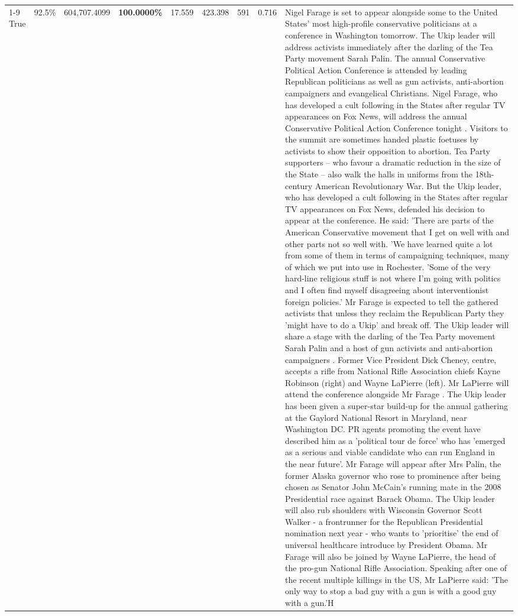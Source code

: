 \begin{table}[H]
\begin{tabular}{lllrlllll}
\cline{1-9}
True & 92.5\% & 604,707.4099 & \bfseries \color{red} 100.0000\% & 17.559 & 423.398 & 591 & 0.716 & Nigel Farage is set to appear alongside some to the United States' most high-profile conservative politicians at a conference in Washington tomorrow. The Ukip leader will address activists immediately after the darling of the Tea Party movement Sarah Palin. The annual Conservative Political Action Conference is attended by leading Republican politicians as well as gun activists, anti-abortion campaigners and evangelical Christians. Nigel Farage, who has developed a cult following in the States after regular TV appearances on Fox News, will address the annual Conservative Political Action Conference tonight . Visitors to the summit are sometimes handed plastic foetuses by activists to show their opposition to abortion. Tea Party supporters – who favour a dramatic reduction in the size of the State – also walk the halls in uniforms from the 18th-century American Revolutionary War. But the Ukip leader, who has developed a cult following in the States after regular TV appearances on Fox News, defended his decision to appear at the conference. He said: 'There are parts of the American Conservative movement that I get on well with and other parts not so well with. 'We have learned quite a lot from some of them in terms of campaigning techniques, many of which we put into use in Rochester. 'Some of the very hard-line religious stuff is not where I'm going with politics and I often find myself disagreeing about interventionist foreign policies.' Mr Farage is expected to tell the gathered activists that unless they reclaim the Republican Party they 'might have to do a Ukip' and break off. The Ukip leader will share a stage with the darling of the Tea Party movement Sarah Palin and a host of gun activists and anti-abortion campaigners . Former Vice President Dick Cheney, centre, accepts a rifle from National Rifle Association chiefs Kayne Robinson (right) and Wayne LaPierre (left). Mr LaPierre will attend the conference alongside Mr Farage . The Ukip leader has been given a super-star build-up for the annual gathering at the Gaylord National Resort in Maryland, near Washington DC. PR agents promoting the event have described him as a 'political tour de force' who has 'emerged as a serious and viable candidate who can run England in the near future'. Mr Farage will appear after Mrs Palin, the former Alaska governor who rose to prominence after being chosen as Senator John McCain's running mate in the 2008 Presidential race against Barack Obama. The Ukip leader will also rub shoulders with Wisconsin Governor Scott Walker - a frontrunner for the Republican Presidential nomination next year - who wants to 'prioritise' the end of universal healthcare introduce by President Obama. Mr Farage will also be joined by Wayne LaPierre, the head of the pro-gun National Rifle Association. Speaking after one of the recent multiple killings in the US, Mr LaPierre said: 'The only way to stop a bad guy with a gun is with a good guy with a gun.'Η \\

\end{tabular}
\end{table}

